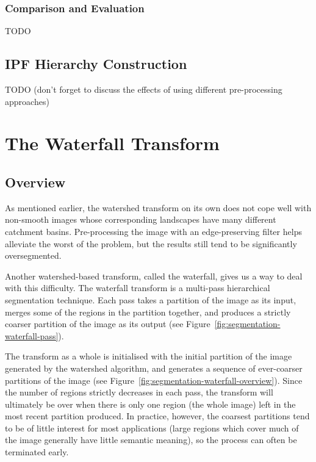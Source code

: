 \subsubsection{Comparison and Evaluation}

TODO

\subsection{IPF Hierarchy Construction}

TODO (don't forget to discuss the effects of using different pre-processing approaches)

\iffalse

\section{The Waterfall Transform}

\subsection{Overview}

As mentioned earlier, the watershed transform on its own does not cope well with non-smooth images whose corresponding landscapes have many different catchment basins. Pre-processing the image with an edge-preserving filter helps alleviate the worst of the problem, but the results still tend to be significantly oversegmented.

Another watershed-based transform, called the waterfall, gives us a way to deal with this difficulty. The waterfall transform is a multi-pass hierarchical segmentation technique. Each pass takes a partition of the image as its input, merges some of the regions in the partition together, and produces a strictly coarser partition of the image as its output (see Figure~\ref{fig:segmentation-waterfall-pass}).


The transform as a whole is initialised with the initial partition of the image generated by the watershed algorithm, and generates a sequence of ever-coarser partitions of the image (see Figure~\ref{fig:segmentation-waterfall-overview}). Since the number of regions strictly decreases in each pass, the transform will ultimately be over when there is only one region (the whole image) left in the most recent partition produced. In practice, however, the coarsest partitions tend to be of little interest for most applications (large regions which cover much of the image generally have little semantic meaning), so the process can often be terminated early.

